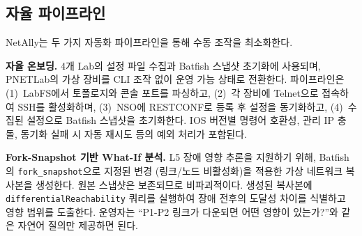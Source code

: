\subsection{자율 파이프라인}

NetAlly는 두 가지 자동화 파이프라인을 통해 수동 조작을 최소화한다.

\textbf{자율 온보딩.}
4개 Lab의 설정 파일 수집과 Batfish 스냅샷 초기화에 사용되며,
PNETLab의 가상 장비를 CLI 조작 없이 운영 가능 상태로 전환한다.
파이프라인은 (1)~LabFS에서 토폴로지와 콘솔 포트를 파싱하고,
(2)~각 장비에 Telnet으로 접속하여 SSH를 활성화하며,
(3)~NSO에 RESTCONF로 등록 후 설정을 동기화하고,
(4)~수집된 설정으로 Batfish 스냅샷을 초기화한다.
IOS 버전별 명령어 호환성, 관리 IP 충돌,
동기화 실패 시 자동 재시도 등의 예외 처리가 포함된다.

\textbf{Fork-Snapshot 기반 What-If 분석.}
L5 장애 영향 추론을 지원하기 위해,
Batfish의 \texttt{fork\_snapshot}으로 지정된 변경
(링크/노드 비활성화)을 적용한 가상 네트워크 복사본을 생성한다.
원본 스냅샷은 보존되므로 비파괴적이다.
생성된 복사본에 \texttt{differentialReachability} 쿼리를 실행하여
장애 전후의 도달성 차이를 식별하고 영향 범위를 도출한다.
운영자는 ``P1-P2 링크가 다운되면 어떤 영향이 있는가?''와 같은
자연어 질의만 제공하면 된다.